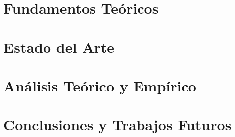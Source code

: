 \documentclass[print, color]{ugrTFG}
\let\cleardoublepage\clearpage
\begin{document}
\maketitle

\frontmatter %


   


                    

            
               


\mainmatter %

\part{Fundamentos Teóricos}



\part{Estado del Arte}


\part{Análisis Teórico y Empírico}



\part{Conclusiones y Trabajos Futuros}



% 
\end{document}
